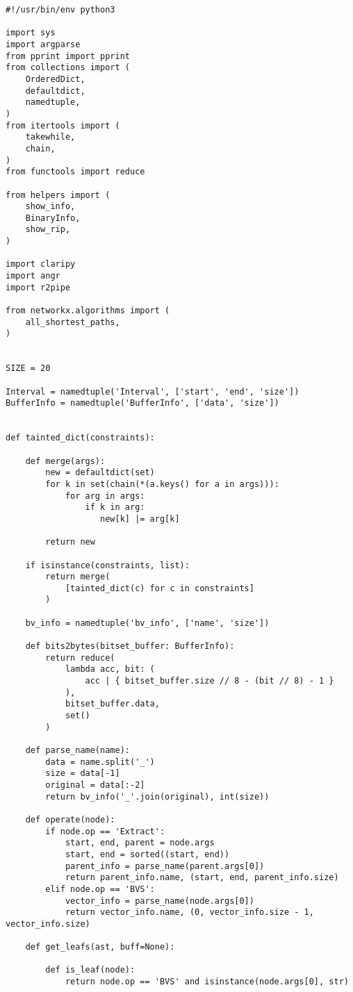 \documentclass[a4paper,12pt]{report}
\begin{document}
\begin{lstlisting}
#!/usr/bin/env python3

import sys
import argparse
from pprint import pprint
from collections import (
    OrderedDict,
    defaultdict,
    namedtuple,
)
from itertools import (
    takewhile,
    chain,
)
from functools import reduce

from helpers import (
    show_info,
    BinaryInfo,
    show_rip,
)

import claripy
import angr
import r2pipe

from networkx.algorithms import (
    all_shortest_paths,
)


SIZE = 20

Interval = namedtuple('Interval', ['start', 'end', 'size'])
BufferInfo = namedtuple('BufferInfo', ['data', 'size'])


def tainted_dict(constraints):

    def merge(args):
        new = defaultdict(set)
        for k in set(chain(*(a.keys() for a in args))):
            for arg in args:
                if k in arg:
                   new[k] |= arg[k]

        return new

    if isinstance(constraints, list):
        return merge(
            [tainted_dict(c) for c in constraints]
        )

    bv_info = namedtuple('bv_info', ['name', 'size'])

    def bits2bytes(bitset_buffer: BufferInfo):
        return reduce(
            lambda acc, bit: (
                acc | { bitset_buffer.size // 8 - (bit // 8) - 1 }
            ),
            bitset_buffer.data,
            set()
        )

    def parse_name(name):
        data = name.split('_')
        size = data[-1]
        original = data[:-2]
        return bv_info('_'.join(original), int(size))

    def operate(node):
        if node.op == 'Extract':
            start, end, parent = node.args
            start, end = sorted((start, end))
            parent_info = parse_name(parent.args[0])
            return parent_info.name, (start, end, parent_info.size)
        elif node.op == 'BVS':
            vector_info = parse_name(node.args[0])
            return vector_info.name, (0, vector_info.size - 1, vector_info.size)

    def get_leafs(ast, buff=None):

        def is_leaf(node):
            return node.op == 'BVS' and isinstance(node.args[0], str)


\end{lstlisting}
\end{document}
